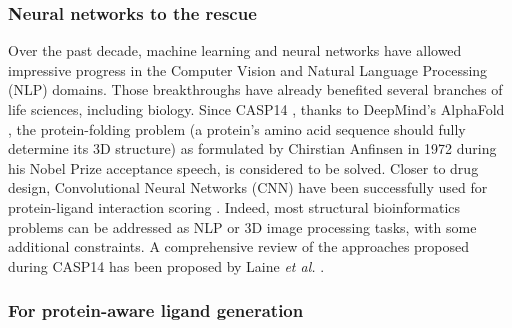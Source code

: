 \documentclass{article}
\begin{document}
\subsubsection{Neural networks to the rescue}

Over the past decade, machine learning and neural networks have allowed impressive progress in the Computer Vision and Natural Language Processing (NLP) domains. Those breakthroughs have already benefited several branches of life sciences, including biology. Since CASP14 \cite{CASP14}, thanks to DeepMind's AlphaFold \cite{AlphaFold}, the protein-folding problem (a protein's amino acid sequence should fully determine its 3D structure) as formulated by Chirstian Anfinsen in 1972 during his Nobel Prize acceptance speech, is considered to be solved. Closer to drug design, Convolutional Neural Networks (CNN) have been successfully used for protein-ligand interaction scoring \cite{PLscoringCNN}. Indeed, most structural bioinformatics problems can be addressed as NLP or 3D image processing tasks, with some additional constraints. A comprehensive review of the approaches proposed during CASP14 \cite{CASP14} has been proposed by Laine \textit{et al.} \cite{ProtRepr}.

\subsubsection{For protein-aware ligand generation}
\label{sec:pbstat}
\end{document}
